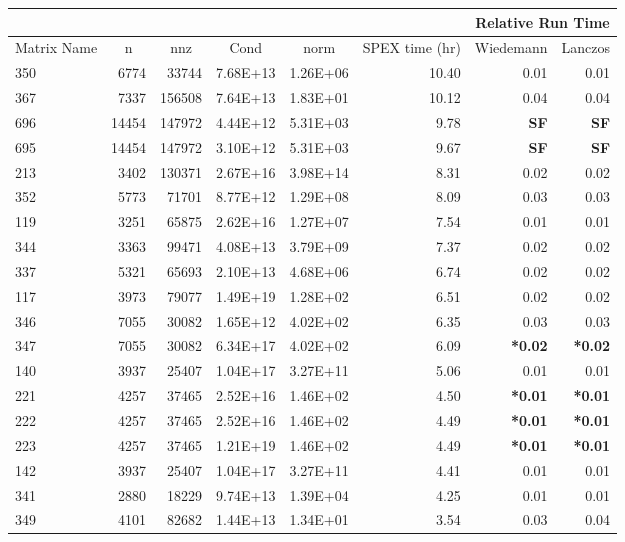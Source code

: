 \documentclass[10pt]{article}
\newcommand{\red}{
	\color{red}	
	}
\begin{document}
\begin{longtable}{|l|r|r|r|r|r|r|r|}
\hline	
& & & & & & \multicolumn{2}{c|}{Relative Run Time}  \\ \hline
\multicolumn{1}{|c|}{Matrix Name}	& \multicolumn{1}{c|}{n} & \multicolumn{1}{c|}{nnz} & \multicolumn{1}{c|}{Cond} & \multicolumn{1}{c|}{norm} & \multicolumn{1}{c|}{SPEX time (hr)} & \multicolumn{1}{c|}{Wiedemann} & \multicolumn{1}{c|}{Lanczos}  \\  \hline \endhead
350	&	6774	&	33744	&	7.68E+13	&	1.26E+06	&	10.40	&	0.01	&	0.01	\\
367	&	7337	&	156508	&	7.64E+13	&	1.83E+01	&	10.12	&	0.04	&	0.04	\\
696	&	14454	&	147972	&	4.44E+12	&	5.31E+03	&	9.78	&	{\bf \red SF}	&	{\bf \red SF}	\\
695	&	14454	&	147972	&	3.10E+12	&	5.31E+03	&	9.67	&	{\bf \red SF}	&	{\bf \red SF}	\\
213	&	3402	&	130371	&	2.67E+16	&	3.98E+14	&	8.31	&	0.02	&	0.02	\\
352	&	5773	&	71701	&	8.77E+12	&	1.29E+08	&	8.09	&	0.03	&	0.03	\\
119	&	3251	&	65875	&	2.62E+16	&	1.27E+07	&	7.54	&	0.01	&	0.01	\\
344	&	3363	&	99471	&	4.08E+13	&	3.79E+09	&	7.37	&	0.02	&	0.02	\\
337	&	5321	&	65693	&	2.10E+13	&	4.68E+06	&	6.74	&	0.02	&	0.02	\\
117	&	3973	&	79077	&	1.49E+19	&	1.28E+02	&	6.51	&	0.02	&	0.02	\\
346	&	7055	&	30082	&	1.65E+12	&	4.02E+02	&	6.35	&	0.03	&	0.03	\\
347	&	7055	&	30082	&	6.34E+17	&	4.02E+02	&	6.09	&	{\bf \red *0.02}	&	{\bf \red *0.02}	\\
140	&	3937	&	25407	&	1.04E+17	&	3.27E+11	&	5.06	&	0.01	&	0.01	\\
221	&	4257	&	37465	&	2.52E+16	&	1.46E+02	&	4.50	&	{\bf \red *0.01}	&	{\bf \red *0.01}	\\
222	&	4257	&	37465	&	2.52E+16	&	1.46E+02	&	4.49	&	{\bf \red *0.01}	&	{\bf \red *0.01}	\\
223	&	4257	&	37465	&	1.21E+19	&	1.46E+02	&	4.49	&	{\bf \red *0.01}	&	{\bf \red *0.01}	\\
142	&	3937	&	25407	&	1.04E+17	&	3.27E+11	&	4.41	&	0.01	&	0.01	\\
341	&	2880	&	18229	&	9.74E+13	&	1.39E+04	&	4.25	&	0.01	&	0.01	\\
349	&	4101	&	82682	&	1.44E+13	&	1.34E+01	&	3.54	&	0.03	&	0.04	\\

\end{longtable}
\end{document}
